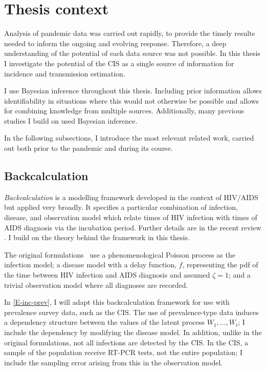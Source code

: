 \documentclass[thesis.tex]{subfiles}
\begin{document}
\section{Thesis context}

Analysis of pandemic data was carried out rapidly, to provide the timely results needed to inform the ongoing and evolving response.
Therefore, a deep understanding of the potential of each data source was not possible.
In this thesis I investigate the potential of the CIS as a single source of information for incidence and transmission estimation.

I use Bayesian inference throughout this thesis.
Including prior information allows identifiability in situations where this would not otherwise be possible and allows for combining knowledge from multiple sources.
Additionally, many previous studies I build on used Bayesian inference.

In the following subsections, I introduce the most relevant related work, carried out both prior to the pandemic and during its course.

\subsection{Backcalculation}

\emph{Backcalculation} is a modelling framework developed in the context of HIV/AIDS~\autocite{brookmeyerMethod} but applied very broadly.
It specifies a particular combination of infection, disease, and observation model which relate times of HIV infection with times of AIDS diagnosis via the incubation period.
Further details are in the recent review \textcite{sunModeling}.
I build on the theory behind the framework in this thesis.

The original formulations~\autocite{brookmeyerMethod,rosenbergBackcalculation} use a phenomenological Poisson process as the infection model; a disease model with a delay function, $f$, representing the pdf of the time between HIV infection and AIDS diagnosis and assumed $\zeta=1$; and a trivial observation model where all diagnoses are recorded.

In \cref{E-inc-prev}, I will adapt this backcalculation framework for use with prevalence survey data, such as the CIS.
The use of prevalence-type data induces a dependency structure between the values of the latent process $W_1, \dots, W_t$; I include the dependency by modifying the disease model.
In addition, unlike in the original formulations, not all infections are detected by the CIS.
In the CIS, a sample of the population receive RT-PCR tests, not the entire population; I include the sampling error arising from this in the observation model.
\end{document}
